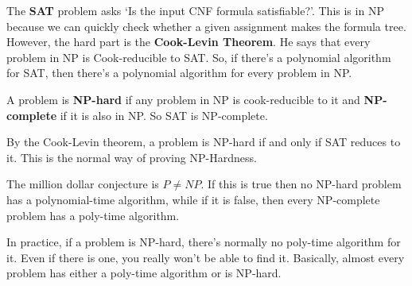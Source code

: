 \documentclass[11pt,a4paper,titlepage,dvipsnames,cmyk]{scrartcl}
\begin{document}
The \textbf{SAT} problem asks `Is the input CNF formula satisfiable?'.
This is in NP because we can quickly check whether a given assignment
makes the formula tree. However, the hard part is the \textbf{Cook-Levin
Theorem}. He says that every problem in NP is Cook-reducible to SAT. So,
if there's a polynomial algorithm for SAT, then there's a polynomial
algorithm for every problem in NP.

A problem is \textbf{NP-hard} if any problem in NP is cook-reducible to it
and \textbf{NP-complete} if it is also in NP. So SAT is NP-complete.

By the Cook-Levin theorem, a problem is NP-hard if and only if SAT reduces
to it. This is the normal way of proving NP-Hardness.

The million dollar conjecture is $P \not = NP$. If this is true then no
NP-hard problem has a polynomial-time algorithm, while if it is false,
then every NP-complete problem has a poly-time algorithm.

In practice, if a problem is NP-hard, there's normally no poly-time
algorithm for it. Even if there is one, you really won't be able to find
it. Basically, almost every problem has either a poly-time algorithm or is
NP-hard.
\end{document}
